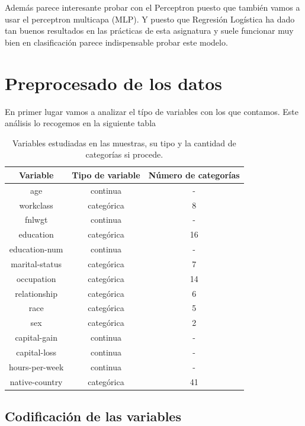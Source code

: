 \documentclass[a4paper,11pt]{article}
\begin{document}
Además parece interesante probar con el Perceptron puesto que también vamos a
usar el perceptron multicapa (MLP). Y puesto que Regresión Logística ha dado tan
buenos resultados en las prácticas de esta asignatura y suele funcionar muy bien
en clasificación parece indispensable probar este modelo.



\section{Preprocesado de los datos}

En primer lugar vamos a analizar el típo de variables con los que contamos. Este
análisis lo recogemos en la siguiente tabla

\begin{table}[h!]
    \centering
    \begin{tabular}{|c|c|c|}
    \hline
    Variable & Tipo de variable & Número de categorías\\ \hline
    age & continua & - \\ \hline
    workclass & categórica & 8 \\ \hline
    fnlwgt & continua & - \\ \hline
    education & categórica & 16 \\ \hline
    education-num & continua & - \\ \hline
    marital-status & categórica & 7 \\ \hline
    occupation & categórica & 14 \\ \hline
    relationship & categórica & 6 \\ \hline
    race & categórica & 5 \\ \hline
    sex & categórica & 2 \\ \hline
    capital-gain & continua & - \\ \hline
    capital-loss & continua & - \\ \hline
    hours-per-week & continua & - \\ \hline
    native-country & categórica & 41 \\ \hline
\end{tabular}
\caption{Variables estudiadas en las muestras, su tipo y la cantidad de categorías si procede.}
\end{table}

\subsection{Codificación de las variables}
\end{document}
